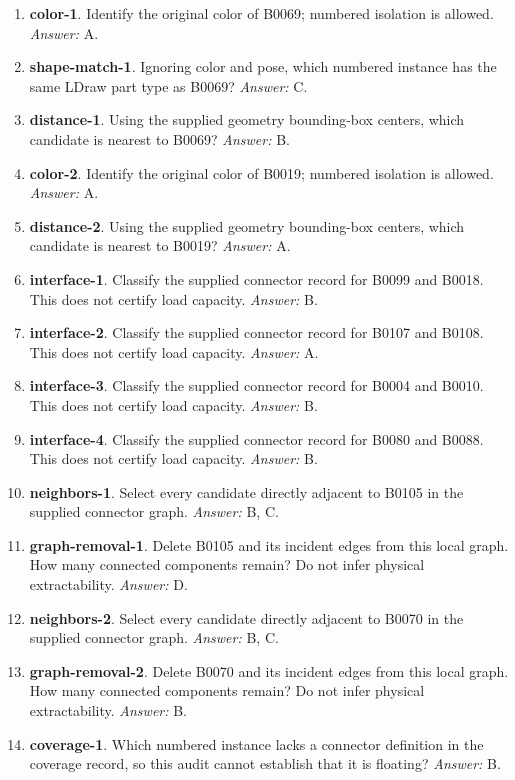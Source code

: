 \begin{enumerate}
\item \textbf{color-1}. Identify the original color of B0069; numbered isolation is allowed. \textit{Answer:} A.
\item \textbf{shape-match-1}. Ignoring color and pose, which numbered instance has the same LDraw part type as B0069? \textit{Answer:} C.
\item \textbf{distance-1}. Using the supplied geometry bounding-box centers, which candidate is nearest to B0069? \textit{Answer:} B.
\item \textbf{color-2}. Identify the original color of B0019; numbered isolation is allowed. \textit{Answer:} A.
\item \textbf{distance-2}. Using the supplied geometry bounding-box centers, which candidate is nearest to B0019? \textit{Answer:} A.
\item \textbf{interface-1}. Classify the supplied connector record for B0099 and B0018. This does not certify load capacity. \textit{Answer:} B.
\item \textbf{interface-2}. Classify the supplied connector record for B0107 and B0108. This does not certify load capacity. \textit{Answer:} A.
\item \textbf{interface-3}. Classify the supplied connector record for B0004 and B0010. This does not certify load capacity. \textit{Answer:} B.
\item \textbf{interface-4}. Classify the supplied connector record for B0080 and B0088. This does not certify load capacity. \textit{Answer:} B.
\item \textbf{neighbors-1}. Select every candidate directly adjacent to B0105 in the supplied connector graph. \textit{Answer:} B, C.
\item \textbf{graph-removal-1}. Delete B0105 and its incident edges from this local graph. How many connected components remain? Do not infer physical extractability. \textit{Answer:} D.
\item \textbf{neighbors-2}. Select every candidate directly adjacent to B0070 in the supplied connector graph. \textit{Answer:} B, C.
\item \textbf{graph-removal-2}. Delete B0070 and its incident edges from this local graph. How many connected components remain? Do not infer physical extractability. \textit{Answer:} B.
\item \textbf{coverage-1}. Which numbered instance lacks a connector definition in the coverage record, so this audit cannot establish that it is floating? \textit{Answer:} B.

\end{enumerate}
